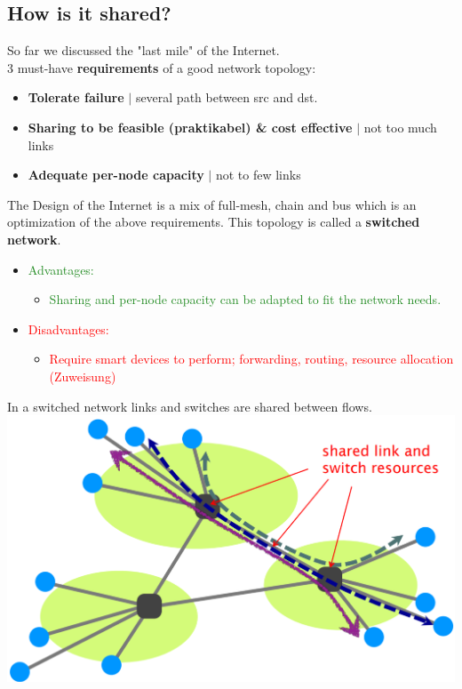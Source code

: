 \documentclass[a4paper, fontsize=8pt, landscape, DIV=1]{scrartcl}
\begin{document}
\begin{multicols*}{4}
			\subsection{How is it shared?}
				So far we discussed the "last mile" of the Internet.\\
				3 must-have \textbf{requirements} of a good network topology: 
				\begin{itemize}
					\item \textbf{Tolerate failure} $\vert$ several path between src and dst.
					\item \textbf{Sharing to be feasible (praktikabel) \& cost effective } $\vert$ not too much links 
					\item \textbf{Adequate per-node capacity} $\vert$ not to few links 
				\end{itemize}
				The Design of the Internet is a mix of full-mesh, chain and bus which is an optimization of the above requirements. This topology is called a \textbf{switched network}.
				\vspace{-0.5cm}
				\begin{itemize}[noitemsep,topsep=0pt]
					\item \textcolor{ForestGreen}{Advantages:}
					\begin{itemize}
						\item \textcolor{ForestGreen}{Sharing and per-node capacity can be adapted to fit the network needs.}
					\end{itemize} 
					\item \textcolor{Red}{Disadvantages:}
					\begin{itemize}
						\item \textcolor{Red}{Require smart devices to perform; forwarding, routing, resource allocation (Zuweisung) }
					\end{itemize} 
				\end{itemize} 
				In a switched network links and switches are shared between flows.
				\includegraphics[width= \columnwidth]{images/Overview/link_switch_sharing.png}
				\columnbreak
				

\end{multicols*}
\end{document}
